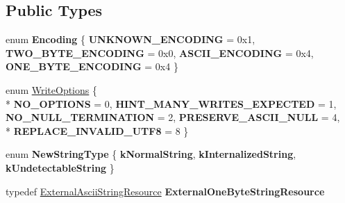 \subsection*{Public Types}
\begin{DoxyCompactItemize}
\item 
enum {\bfseries Encoding} \{ {\bfseries U\-N\-K\-N\-O\-W\-N\-\_\-\-E\-N\-C\-O\-D\-I\-N\-G} =  0x1, 
{\bfseries T\-W\-O\-\_\-\-B\-Y\-T\-E\-\_\-\-E\-N\-C\-O\-D\-I\-N\-G} =  0x0, 
{\bfseries A\-S\-C\-I\-I\-\_\-\-E\-N\-C\-O\-D\-I\-N\-G} =  0x4, 
{\bfseries O\-N\-E\-\_\-\-B\-Y\-T\-E\-\_\-\-E\-N\-C\-O\-D\-I\-N\-G} =  0x4
 \}
\item 
enum \hyperlink{classv8_1_1String_a9ce7f1458ffd08f8eb2b9c8dc056e616}{Write\-Options} \{ \\*
{\bfseries N\-O\-\_\-\-O\-P\-T\-I\-O\-N\-S} =  0, 
{\bfseries H\-I\-N\-T\-\_\-\-M\-A\-N\-Y\-\_\-\-W\-R\-I\-T\-E\-S\-\_\-\-E\-X\-P\-E\-C\-T\-E\-D} =  1, 
{\bfseries N\-O\-\_\-\-N\-U\-L\-L\-\_\-\-T\-E\-R\-M\-I\-N\-A\-T\-I\-O\-N} =  2, 
{\bfseries P\-R\-E\-S\-E\-R\-V\-E\-\_\-\-A\-S\-C\-I\-I\-\_\-\-N\-U\-L\-L} =  4, 
\\*
{\bfseries R\-E\-P\-L\-A\-C\-E\-\_\-\-I\-N\-V\-A\-L\-I\-D\-\_\-\-U\-T\-F8} =  8
 \}
\item 
enum {\bfseries New\-String\-Type} \{ {\bfseries k\-Normal\-String}, 
{\bfseries k\-Internalized\-String}, 
{\bfseries k\-Undetectable\-String}
 \}
\item 
\hypertarget{classv8_1_1String_aefa36d4416f7f2b0c415dfa2d225e728}{typedef \hyperlink{classv8_1_1String_1_1ExternalAsciiStringResource}{External\-Ascii\-String\-Resource} {\bfseries External\-One\-Byte\-String\-Resource}}\label{classv8_1_1String_aefa36d4416f7f2b0c415dfa2d225e728}

\end{DoxyCompactItemize}
